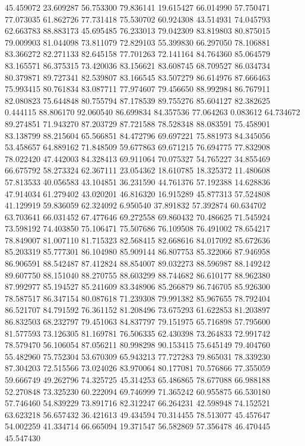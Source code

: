 45.459072
23.609287
56.753300
79.836141
19.615427
66.014990
57.750471
77.073035
61.862726
77.731418
75.530702
60.924308
43.514931
74.045793
62.663783
88.883173
45.695485
76.233013
79.042309
83.819803
80.875015
79.009903
81.044098
73.811079
72.829103
55.399830
66.297050
78.106881
83.366272
82.271133
82.645158
77.701263
72.141164
84.764360
85.064579
83.165571
86.375315
73.420036
83.156621
83.608745
68.709527
86.034734
80.379871
89.727341
82.539807
83.166545
83.507279
86.614976
87.666463
75.993415
80.761834
83.087711
77.974607
79.456650
88.992984
86.767911
82.080823
75.644848
80.755794
87.178539
89.755276
85.604127
82.382625
0.444115
88.806170
92.060540
86.699834
84.357536
77.064263
0.083612
64.734672
89.274851
71.943270
87.203729
87.721588
78.528348
88.083591
75.458901
83.138799
88.215604
65.566851
84.472796
69.697221
75.881973
84.345056
53.458657
64.889162
71.848509
59.677863
69.671215
76.694775
77.832908
78.022420
47.442003
84.328413
69.911064
70.075327
54.765227
34.855469
66.675792
58.273324
62.367111
23.054362
18.610785
18.325372
11.480608
57.813533
40.056583
43.104851
36.231590
44.761376
57.192388
14.628836
47.914034
61.279402
43.020201
46.816320
16.915289
45.877313
57.524808
41.129919
59.836059
62.324092
6.950540
37.891832
57.392874
60.634702
63.703641
66.031452
67.477646
69.272558
69.860432
70.486625
71.545924
73.598192
74.403850
75.106471
75.507686
76.109508
76.491002
78.654217
78.849007
81.007110
81.715323
82.568415
82.668616
84.017092
85.672636
85.203319
85.777301
86.104980
85.909144
86.807753
85.322066
87.946958
86.906591
88.542487
87.412824
88.854007
89.032273
88.596987
88.149242
89.607750
88.151040
88.270755
88.603299
88.744682
86.610177
88.962380
87.992977
85.194527
85.241609
83.348906
85.266879
86.746705
85.926300
78.587517
86.347154
80.087618
71.239308
79.991382
85.967655
78.792404
86.521707
84.791592
76.361152
81.208496
73.675293
61.622853
81.203897
86.832503
68.232797
79.451063
84.837797
79.151975
65.716898
57.795600
81.577593
73.126305
81.169781
76.506335
62.430398
73.264833
72.991742
78.579470
56.106054
87.056211
80.998298
90.153415
75.645149
79.404760
55.482960
75.752304
53.670309
65.943213
77.727283
79.865031
78.339230
87.304203
72.515566
73.024026
83.970064
80.177081
70.576866
77.355059
59.666749
49.262796
74.325725
45.314253
65.486865
78.677088
66.988188
52.270848
73.325230
60.222094
69.746999
71.365242
60.955875
66.530180
57.746460
54.839229
73.891716
82.312247
66.264231
42.598948
74.152521
63.623218
56.657432
36.421613
49.434594
70.314455
78.513077
45.457647
54.002259
41.334714
66.665094
19.371547
56.582869
57.356478
46.470445
45.547430
